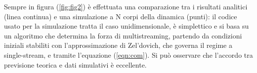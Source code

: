 Sempre in figura (\ref{fig:fig2}) è effettuata una comparazione tra i risultati analitici (linea continua) e una simulazione 
a N corpi della dinamica (punti): il codice usato per la simulazione tratta il caso unidimensionale, è simplettico
e si basa su un algoritmo che determina la forza di multistreaming, partendo da condizioni iniziali stabiliti con
l'approssimazione di Zel'dovich, che governa il regime a single-stream, e tramite l'equazione (\ref{eqn:com}).
Si può osservare che l'accordo tra previsione teorica e dati simulativi è eccellente.